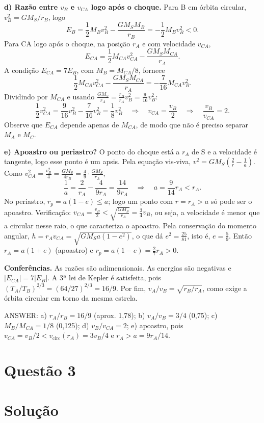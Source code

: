 \documentclass{article}%
\begin{document}
\noindent\textbf{d) Razão entre $v_B$ e $v_{CA}$ logo após o choque.} Para B em órbita circular, $v_B^2 = GM_S/r_B$, logo
\[
E_B = \frac{1}{2}M_Bv_B^2 - \frac{GM_SM_B}{r_B} = -\frac{1}{2}M_Bv_B^2 < 0.
\]
Para CA logo após o choque, na posição $r_A$ e com velocidade $v_{CA}$,
\[
E_{CA} = \frac{1}{2}M_{CA}v_{CA}^2 - \frac{GM_SM_{CA}}{r_A}.
\]
A condição $E_{CA} = 7E_B$, com $M_B = M_{CA}/8$, fornece
\[
\frac{1}{2}M_{CA}v_{CA}^2 - \frac{GM_SM_{CA}}{r_A} = -\frac{7}{16}M_{CA}v_B^2.
\]
Dividindo por $M_{CA}$ e usando $\frac{GM_S}{r_A} = \frac{r_B}{r_A}v_B^2 = \frac{9}{16}v_B^2$:
\[
\frac{1}{2}v_{CA}^2 = \frac{9}{16}v_B^2 - \frac{7}{16}v_B^2 = \frac{1}{8}v_B^2 \quad\Rightarrow\quad v_{CA} = \frac{v_B}{2} \quad\Rightarrow\quad \frac{v_B}{v_{CA}} = 2.
\]
Observe que $E_{CA}$ depende apenas de $M_{CA}$, de modo que não é preciso separar $M_A$ e $M_C$.

\noindent\textbf{e) Apoastro ou periastro?} O ponto do choque está a $r_A$ de S e a velocidade é tangente, logo esse ponto é um apsis. Pela equação vis-viva, $v^2 = GM_S\left(\frac{2}{r} - \frac{1}{a}\right)$. Como $v_{CA}^2 = \frac{v_B^2}{4} = \frac{GM_S}{4r_B} = \frac{4}{9}\cdot\frac{GM_S}{r_A}$,
\[
\frac{1}{a} = \frac{2}{r_A} - \frac{4}{9r_A} = \frac{14}{9r_A} \quad\Rightarrow\quad a = \frac{9}{14}r_A < r_A.
\]
No periastro, $r_p = a(1-e) \le a$; logo um ponto com $r = r_A > a$ só pode ser o apoastro. Verificação: $v_{CA} = \frac{v_B}{2} < \sqrt{\frac{GM_S}{r_A}} = \frac{3}{4}v_B$, ou seja, a velocidade é menor que a circular nesse raio, o que caracteriza o apoastro. Pela conservação do momento angular, $h = r_Av_{CA} = \sqrt{GM_Sa(1-e^2)}$, o que dá $e^2 = \frac{25}{81}$, isto é, $e = \frac{5}{9}$. Então $r_A = a(1+e)$ (apoastro) e $r_p = a(1-e) = \frac{2}{7}r_A > 0$.

\noindent\textbf{Conferências.} As razões são adimensionais. As energias são negativas e $|E_{CA}| = 7|E_B|$. A 3ª lei de Kepler é satisfeita, pois $(T_A/T_B)^{2/3} = (64/27)^{2/3} = 16/9$. Por fim, $v_A/v_B = \sqrt{r_B/r_A}$, como exige a órbita circular em torno da mesma estrela.

ANSWER: a) $r_A/r_B = 16/9$ (aprox. 1,78); b) $v_A/v_B = 3/4$ (0,75); c) $M_B/M_{CA} = 1/8$ (0,125); d) $v_B/v_{CA} = 2$; e) apoastro, pois $v_{CA} = v_B/2 < v_{\text{circ}}(r_A) = 3v_B/4$ e $r_A > a = 9r_A/14$.%
\newpage%
\section*{Questão 3}

\section*{Solução}
\end{document}

